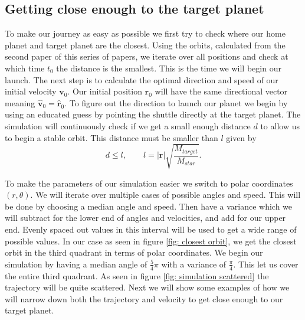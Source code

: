 \documentclass[reprint,english,notitlepage]{revtex4-2}
\begin{document}
\subsection{Getting close enough to the target planet}
To make our journey as easy as possible we first try to check where our home planet and target planet are the closest. Using the orbits, calculated from the second paper %
of this series of papers, we iterate over all positions and check at which time $ t_{0} $ the distance is the smallest. This is the time we will begin our launch. The next step is to calculate the optimal direction and speed of our initial velocity $ \mathbf{v}_0 $. Our initial position $ \mathbf{r}_0 $ will have the same directional vector meaning $ \hat{\mathbf{v}}_0 = \hat{\mathbf{r}}_0  $. To figure out the direction to launch our planet we begin by using an educated guess by pointing the shuttle directly at the target planet. The simulation will continuously check if we get a small enough distance $ d $ to allow us to begin a stable orbit. This distance must be smaller than $ l $ given by
\[
d \le l, \qquad l = \left\vert \mathbf{r} \right\vert \sqrt{\frac{M_{target}}{M_{star}}}.
\]


To make the parameters of our simulation easier we switch to polar coordinates $ (r, θ) $. We will iterate over multiple cases of possible angles and speed. This will be done by choosing a median angle and speed. Then have a variance which we will subtract for the lower end of angles and velocities, and add for our upper end. Evenly spaced out values in this interval will be used to get a wide range of possible values. In our case as seen in figure \ref{fig: closest orbit}, we get the closest orbit in the third quadrant in terms of polar coordinates. We begin our simulation by having a median angle of $ \frac{5}{4}π $ with a variance of $ \frac{π}{4} $. This let us cover the entire third quadrant. As seen in figure \ref{fig: simulation scattered} the trajectory will be quite scattered. Next we will show some examples of how we will narrow down both the trajectory and velocity to get close enough to our target planet. 
\end{document}
